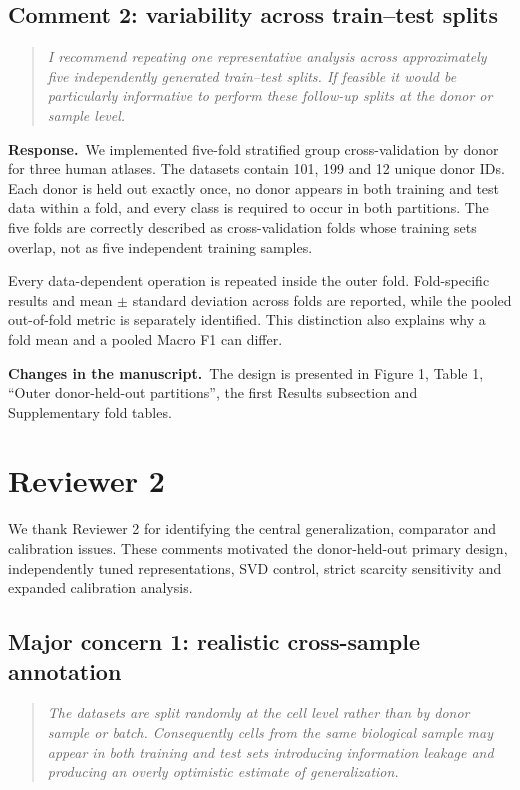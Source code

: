 \documentclass[11pt,a4paper]{article}
\newcommand{\commenttext}[1]{\begin{quote}\itshape #1\end{quote}}
\newcommand{\responsehead}{\par\noindent\textbf{Response.}\ }
\newcommand{\changehead}{\par\noindent\textbf{Changes in the manuscript.}\ }
\begin{document}
\subsection*{Comment 2: variability across train--test splits}

\commenttext{I recommend repeating one representative analysis across approximately five independently generated train--test splits. If feasible it would be particularly informative to perform these follow-up splits at the donor or sample level.}

\responsehead We implemented five-fold stratified group cross-validation by donor for three human atlases. The datasets contain 101, 199 and 12 unique donor IDs. Each donor is held out exactly once, no donor appears in both training and test data within a fold, and every class is required to occur in both partitions. The five folds are correctly described as cross-validation folds whose training sets overlap, not as five independent training samples.

Every data-dependent operation is repeated inside the outer fold. Fold-specific results and mean $\pm$ standard deviation across folds are reported, while the pooled out-of-fold metric is separately identified. This distinction also explains why a fold mean and a pooled Macro F1 can differ.

\changehead The design is presented in Figure 1, Table 1, ``Outer donor-held-out partitions'', the first Results subsection and Supplementary fold tables.

\section*{Reviewer 2}

We thank Reviewer 2 for identifying the central generalization, comparator and calibration issues. These comments motivated the donor-held-out primary design, independently tuned representations, SVD control, strict scarcity sensitivity and expanded calibration analysis.

\subsection*{Major concern 1: realistic cross-sample annotation}

\commenttext{The datasets are split randomly at the cell level rather than by donor sample or batch. Consequently cells from the same biological sample may appear in both training and test sets introducing information leakage and producing an overly optimistic estimate of generalization.}
\end{document}
